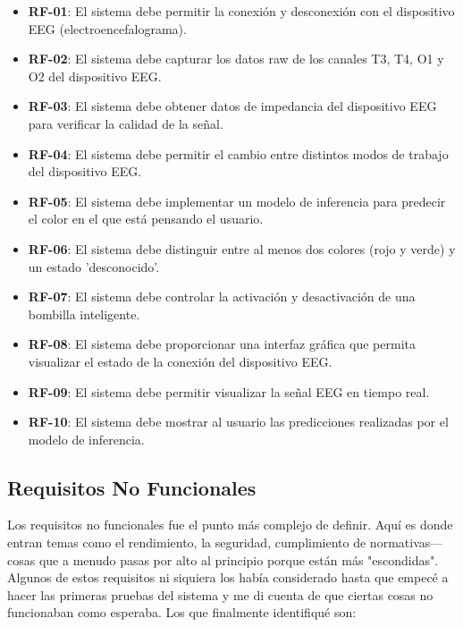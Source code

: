 \begin{itemize}
    \item \textbf{RF-01}: El sistema debe permitir la conexión y desconexión con el dispositivo EEG (electroencefalograma).
    \item \textbf{RF-02}: El sistema debe capturar los datos raw de los canales T3, T4, O1 y O2 del dispositivo EEG.
    \item \textbf{RF-03}: El sistema debe obtener datos de impedancia del dispositivo EEG para verificar la calidad de la señal.
    \item \textbf{RF-04}: El sistema debe permitir el cambio entre distintos modos de trabajo del dispositivo EEG.
    \item \textbf{RF-05}: El sistema debe implementar un modelo de inferencia para predecir el color en el que está pensando el usuario.
    \item \textbf{RF-06}: El sistema debe distinguir entre al menos dos colores (rojo y verde) y un estado 'desconocido'.
    \item \textbf{RF-07}: El sistema debe controlar la activación y desactivación de una bombilla inteligente.
    \item \textbf{RF-08}: El sistema debe proporcionar una interfaz gráfica que permita visualizar el estado de la conexión del dispositivo EEG.
    \item \textbf{RF-09}: El sistema debe permitir visualizar la señal EEG en tiempo real.
    \item \textbf{RF-10}: El sistema debe mostrar al usuario las predicciones realizadas por el modelo de inferencia.
\end{itemize}

\newpage

\subsection{Requisitos No Funcionales}

Los requisitos no funcionales fue el punto más complejo de definir. Aquí es donde entran temas como el rendimiento, la seguridad, cumplimiento de normativas—cosas que a menudo pasas por alto al principio porque están más "escondidas". Algunos de estos requisitos ni siquiera los había considerado hasta que empecé a hacer las primeras pruebas del sistema y me di cuenta de que ciertas cosas no funcionaban como esperaba. Los que finalmente identifiqué son:


